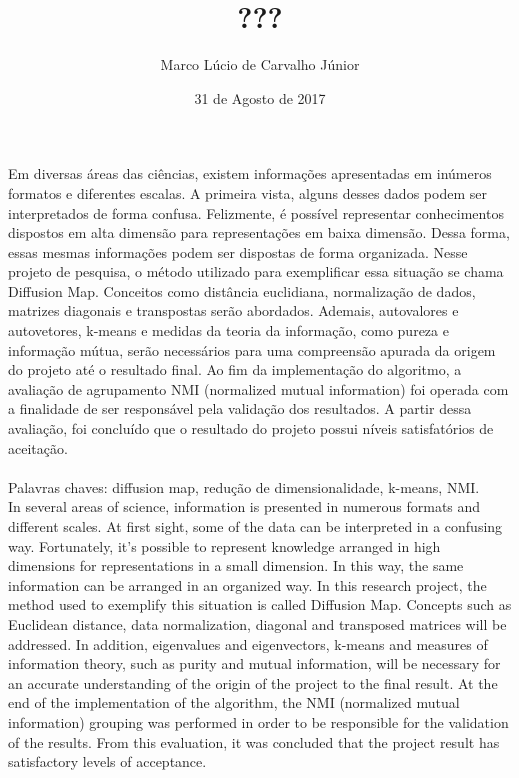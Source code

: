 \documentclass{article}
\title{???}
\author{Marco Lúcio de Carvalho Júnior}
\date{31 de Agosto de 2017}
\begin{document}
    \maketitle

    \newpage

    \abstract

        Em diversas áreas das ciências, existem informações apresentadas em inúmeros formatos e diferentes escalas.
        A primeira vista, alguns desses dados podem ser interpretados de forma confusa.
        Felizmente, é possível representar conhecimentos dispostos em alta dimensão para representações em baixa dimensão.
        Dessa forma, essas mesmas informações podem ser dispostas de forma organizada.
        Nesse projeto de pesquisa, o método utilizado para exemplificar essa situação se chama Diffusion Map.
        Conceitos como distância euclidiana, normalização de dados, matrizes diagonais e transpostas serão abordados.
        Ademais, autovalores e autovetores, k-means e medidas da teoria da informação, como pureza e informação mútua, serão necessários para uma compreensão apurada da origem do projeto até o resultado final.
        Ao fim da implementação do algoritmo, a avaliação de agrupamento NMI (normalized mutual information) foi operada com a finalidade de ser responsável pela validação dos resultados.
        A partir dessa avaliação, foi concluído que o resultado do projeto possui níveis satisfatórios de aceitação. \\

        \\ Palavras chaves: diffusion map, redução de dimensionalidade, k-means, NMI. \\

        In several areas of science, information is presented in numerous formats and different scales.
        At first sight, some of the data can be interpreted in a confusing way.
        Fortunately, it's possible to represent knowledge arranged in high dimensions for representations in a small dimension.
        In this way, the same information can be arranged in an organized way.
        In this research project, the method used to exemplify this situation is called Diffusion Map.
        Concepts such as Euclidean distance, data normalization, diagonal and transposed matrices will be addressed.
        In addition, eigenvalues and eigenvectors, k-means and measures of information theory, such as purity and mutual information, will be necessary for an accurate understanding of the origin of the project to the final result.
        At the end of the implementation of the algorithm, the NMI (normalized mutual information) grouping was performed in order to be responsible for the validation of the results.
        From this evaluation, it was concluded that the project result has satisfactory levels of acceptance. \\
\end{document}
